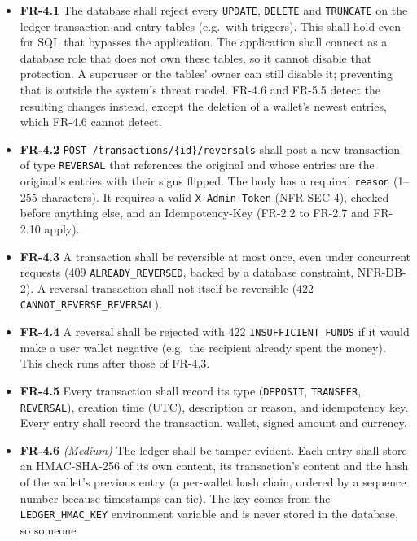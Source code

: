 \documentclass[11pt,a4paper]{article}
\providecommand{\tightlist}{\setlength{\itemsep}{2pt}\setlength{\parskip}{0pt}}
\begin{document}
\begin{itemize}
\tightlist
\item
  \textbf{FR-4.1} The database shall reject every \texttt{UPDATE}, \texttt{DELETE} and \texttt{TRUNCATE} on the ledger
  transaction and entry tables (e.g.~with triggers). This shall hold even for SQL that bypasses the
  application. The application shall connect as a database role that does not own these tables,
  so it cannot disable that protection. A superuser or the tables' owner can still disable it;
  preventing that is outside the system's threat model. FR-4.6 and FR-5.5 detect the resulting
  changes instead, except the deletion of a wallet's newest entries, which FR-4.6 cannot detect.
\item
  \textbf{FR-4.2} \texttt{POST\ /\allowbreak{}transactions/\allowbreak{}\{id\}/\allowbreak{}reversals} shall post a new transaction of type \texttt{REVERSAL}
  that references the original and whose entries are the original's entries with their signs
  flipped. The body has a required \texttt{reason} (1--255 characters). It requires a valid
  \texttt{X-Admin-Token} (NFR-SEC-4), checked before anything else, and an Idempotency-Key (FR-2.2 to
  FR-2.7 and FR-2.10 apply).
\item
  \textbf{FR-4.3} A transaction shall be reversible at most once, even under concurrent requests (409
  \texttt{ALREADY\_\allowbreak{}REVERSED}, backed by a database constraint, NFR-DB-2). A reversal transaction shall not
  itself be reversible (422 \texttt{CANNOT\_\allowbreak{}REVERSE\_\allowbreak{}REVERSAL}).
\item
  \textbf{FR-4.4} A reversal shall be rejected with 422 \texttt{INSUFFICIENT\_\allowbreak{}FUNDS} if it would make a user
  wallet negative (e.g.~the recipient already spent the money). This check runs after those of
  FR-4.3.
\item
  \textbf{FR-4.5} Every transaction shall record its type (\texttt{DEPOSIT}, \texttt{TRANSFER}, \texttt{REVERSAL}), creation
  time (UTC), description or reason, and idempotency key. Every entry shall record the
  transaction, wallet, signed amount and currency.
\item
  \textbf{FR-4.6} \emph{(Medium)} The ledger shall be tamper-evident. Each entry shall store an HMAC-SHA-256
  of its own content, its transaction's content and the hash of the wallet's previous entry (a
  per-wallet hash chain, ordered by a sequence number because timestamps can tie). The key comes
  from the \texttt{LEDGER\_\allowbreak{}HMAC\_\allowbreak{}KEY} environment variable and is never stored in the database, so someone

\end{itemize}
\end{document}
